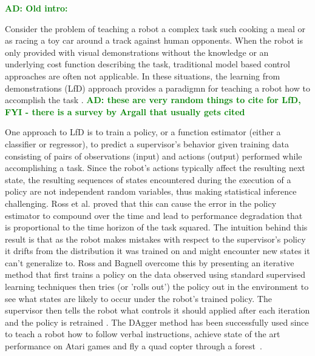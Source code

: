\documentclass[10pt, conference]{ieeeconf}      %
\newcommand{\adnote}[1]{\ifthenelse{\boolean{include-notes}}%
 {\textcolor{green}{\textbf{AD: #1}}}{}}
\begin{document}
\adnote{Old intro:}

Consider the problem of teaching a robot a complex task such cooking a meal or as racing a toy car around a track
against human opponents. When the robot is only provided with visual demonstrations without the knowledge or an
underlying cost function describing the task, traditional model based control approaches are often not applicable. In
these situations, the learning from demonstrations (LfD) approach provides a paradigmn for teaching a robot how to
accomplish the task \cite{ross2013learning,pomerleau1989alvinn,schulman2013case}.\adnote{these are very random things to cite for LfD, FYI - there is a survey by Argall that usually gets cited}

One approach to LfD is to train a policy, or a function estimator (either a classifier or regressor), to predict a
supervisor's behavior given training data consisting of pairs of observations (input) and actions (output) performed
while accomplishing a task. Since the robot's actions typically affect the resulting next state, the resulting sequences
of states encountered during the execution of a policy are not independent random variables, thus making statistical
inference challenging. Ross et al. proved that this can cause the error in the policy estimator to compound over the
time and lead to performance degradation that is proportional to the time horizon of the task squared. The intuition
behind this result is that as the robot makes mistakes with respect to the supervisor's policy it drifts from the
distribution it was trained on and might encounter new states it can't generalize to.  Ross and Bagnell overcome this by
presenting an iterative method that first trains a policy on the data observed using standard supervised learning
techniques then tries (or 'rolls out') the policy out in the environment to see what states are likely to occur under
the robot's trained policy.  The supervisor then tells the robot what controls it should applied after each iteration
and the policy is retrained \cite{ross2010reduction}. The DAgger method has been successfully used since to teach a
robot how to follow verbal instructions, achieve state of the art performance on Atari games and fly a quad copter
through a forest~\cite{NIPS2014_5421,duvallet2013imitation,ross2013learning}.
\end{document}
